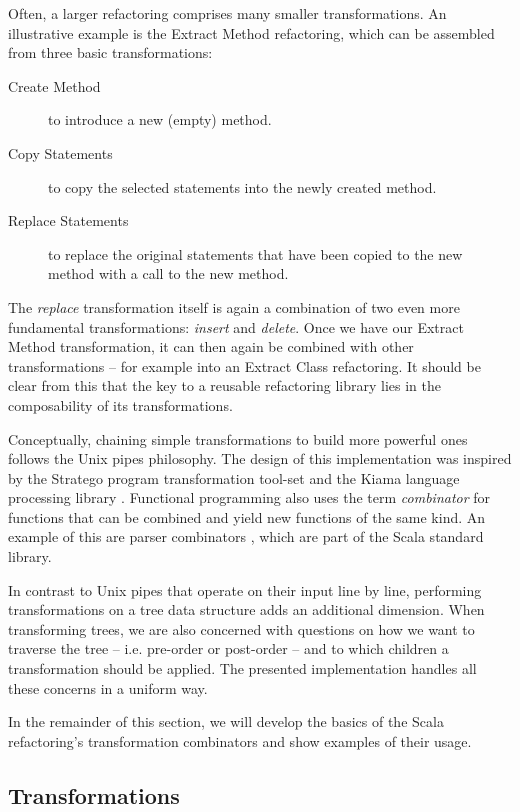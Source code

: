 Often, a larger refactoring comprises many smaller transformations. An illustrative example is the Extract Method refactoring, which can be assembled from three basic transformations:

\begin{description}
 \item[Create Method] to introduce a new (empty) method.
 \item[Copy Statements] to copy the selected statements into the newly created method.
 \item[Replace Statements] to replace the original statements that have been copied to the new method with a call to the new method.
\end{description}

The \textit{replace} transformation itself is again a combination of two even more fundamental transformations: \textit{insert} and \textit{delete}. Once we have our Extract Method transformation, it can then again be combined with other transformations -- for example into an Extract Class refactoring. It should be clear from this that the key to a reusable refactoring library lies in the composability of its transformations. 

Conceptually, chaining simple transformations to build more powerful ones follows the Unix pipes philosophy. The design of this implementation was inspired by the Stratego program transformation tool-set \cite{Stratego} and the Kiama language processing library \cite{Kiama}. Functional programming also uses the term \textit{combinator} for functions that can be combined and yield new functions of the same kind. An example of this are parser combinators \cite{ParserCombinators}, which are part of the Scala standard library.

In contrast to Unix pipes that operate on their input line by line, performing transformations on a tree data structure adds an additional dimension. When transforming trees, we are also concerned with questions on how we want to traverse the tree -- i.e. pre-order or post-order -- and to which children a transformation should be applied. The presented implementation handles all these concerns in a uniform way.

In the remainder of this section, we will develop the basics of the Scala refactoring's transformation combinators and show examples of their usage.

\subsection{Transformations}

